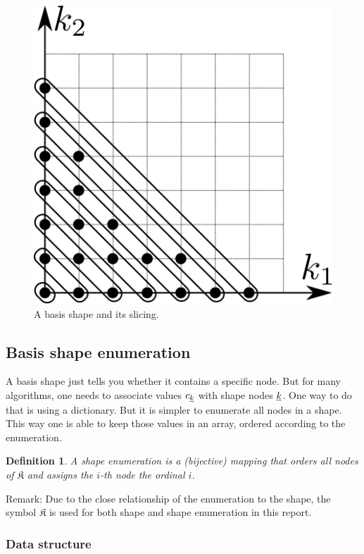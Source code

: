 \documentclass{article}
\newtheorem{definition}{Definition}
\begin{document}
\begin{figure}[H]
  \centering
  \includegraphics[]{shape_slicing}
  \caption{A basis shape and its slicing.}
\end{figure}


\subsection{Basis shape enumeration}
A basis shape just tells you whether it contains a specific node. But
for many algorithms, one needs to associate values \(c_{\underline{k}}\) with shape
nodes \(\underline{k}\). One way to do that is using a dictionary. But it is simpler to
enumerate all nodes in a shape.  This way one is able to keep those
values in an array, ordered according to the enumeration.

\begin{definition}
  A shape enumeration is a (bijective) mapping that orders all nodes
  of \( \mathfrak{K} \)
  and assigns the \(i\)-th node the ordinal \(i\).
\end{definition}

Remark: Due to the close relationship of the enumeration to the shape,
the symbol \(\mathfrak{K}\) is used for both shape and
shape enumeration in this report.

\subsubsection{Data structure}
\end{document}
